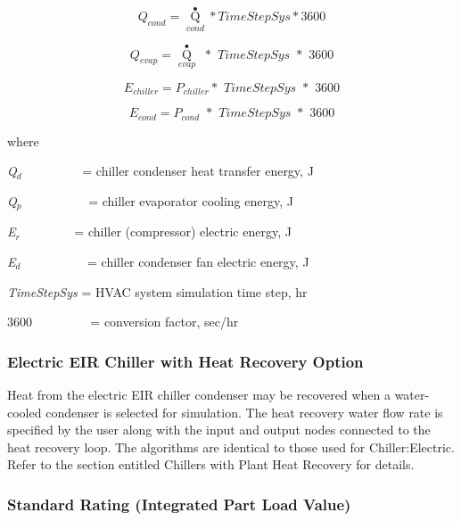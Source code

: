 \begin{equation}
{Q_{cond}} = {\mathop Q\limits^ \bullet_{cond}}*TimeStepSys*3600
\end{equation}

\begin{equation}
{Q_{evap}} = {\mathop Q\limits^ \bullet_{evap}}\,\,*\,\,TimeStepSys\,\,*\,\,3600
\end{equation}

\begin{equation}
{E_{chiller}} = {P_{chiller}}*\,\,TimeStepSys\,\,*\,\,3600
\end{equation}

\begin{equation}
{E_{cond}} = {P_{cond}}\,\, * \,\,TimeStepSys\,\,*\,\,3600
\end{equation}

where

\emph{Q\(_{d}\)}~~~~~~~~~ = chiller condenser heat transfer energy, J

\emph{Q\(_{p}\)}~~~~~~~~~~ = chiller evaporator cooling energy, J

\emph{E\(_{r}\)}~~~~~~~~ = chiller (compressor) electric energy, J

\emph{E\(_{d}\)}~~~~~~~~~~ = chiller condenser fan electric energy, J

\emph{TimeStepSys} = HVAC system simulation time step, hr

\(3600\) ~~~~~~~~ = conversion factor, sec/hr

\subsubsection{Electric EIR Chiller with Heat Recovery Option}\label{electric-eir-chiller-with-heat-recovery-option}

Heat from the electric EIR chiller condenser may be recovered when a water-cooled condenser is selected for simulation. The heat recovery water flow rate is specified by the user along with the input and output nodes connected to the heat recovery loop. The algorithms are identical to those used for Chiller:Electric. Refer to the section entitled Chillers with Plant Heat Recovery for details.

\subsubsection{Standard Rating (Integrated Part Load Value)}\label{standard-rating-integrated-part-load-value}

